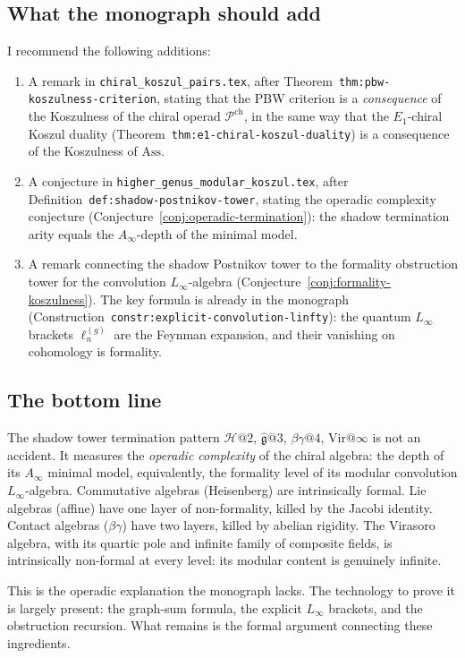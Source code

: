 \documentclass[11pt]{article}
\theoremstyle{definition}
\theoremstyle{remark}
\newcommand{\Pch}{\mathcal{P}^{\mathrm{ch}}}
\newcommand{\Heis}{\mathcal{H}}
\newcommand{\Vir}{\mathrm{Vir}}
\begin{document}
\subsection{What the monograph should add}

I recommend the following additions:

\begin{enumerate}
\item A remark in \texttt{chiral\_koszul\_pairs.tex}, after
  Theorem~\texttt{thm:pbw-koszulness-criterion}, stating that the
  PBW criterion is a \emph{consequence} of the Koszulness of the
  chiral operad $\Pch$, in the same way that the $E_1$-chiral
  Koszul duality (Theorem~\texttt{thm:e1-chiral-koszul-duality}) is
  a consequence of the Koszulness of $\mathrm{Ass}$.

\item A conjecture in \texttt{higher\_genus\_modular\_koszul.tex},
  after Definition~\texttt{def:shadow-postnikov-tower}, stating the
  operadic complexity conjecture (Conjecture~\ref{conj:operadic-termination}):
  the shadow termination arity equals the $A_\infty$-depth of the
  minimal model.

\item A remark connecting the shadow Postnikov tower to the
  formality obstruction tower for the convolution $L_\infty$-algebra
  (Conjecture~\ref{conj:formality-koszulness}).  The key formula is
  already in the monograph
  (Construction~\texttt{constr:explicit-convolution-linfty}):
  the quantum $L_\infty$ brackets $\ell_n^{(g)}$ are the Feynman
  expansion, and their vanishing on cohomology is formality.
\end{enumerate}

\subsection{The bottom line}

The shadow tower termination pattern
$\Heis @2$, $\widehat{\mathfrak{g}} @3$, $\beta\gamma @4$,
$\Vir @\infty$ is not an accident.  It measures the
\emph{operadic complexity} of the chiral algebra: the depth of its
$A_\infty$ minimal model, equivalently, the formality level of
its modular convolution $L_\infty$-algebra.  Commutative algebras
(Heisenberg) are intrinsically formal.  Lie algebras (affine) have
one layer of non-formality, killed by the Jacobi identity.  Contact
algebras ($\beta\gamma$) have two layers, killed by abelian
rigidity.  The Virasoro algebra, with its quartic pole and infinite
family of composite fields, is intrinsically non-formal at every
level: its modular content is genuinely infinite.

This is the operadic explanation the monograph lacks.  The
technology to prove it is largely present: the graph-sum formula,
the explicit $L_\infty$ brackets, and the obstruction recursion.
What remains is the formal argument connecting these ingredients.
\end{document}
